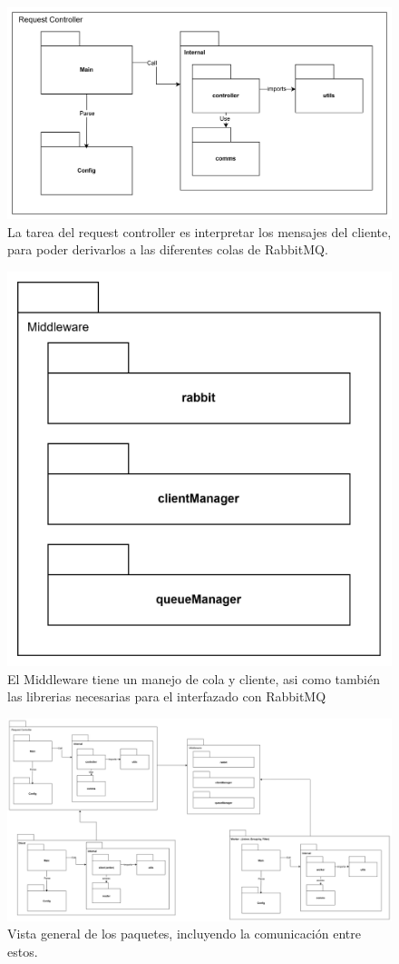 \documentclass[titlepage,a4paper]{article}
\begin{document}
\begin{figure}[H]
    \centering
    \includegraphics[width=1\linewidth]{request_controller.png}
    \caption{La tarea del request controller es interpretar los mensajes del cliente, para poder derivarlos a las diferentes colas de RabbitMQ.}
\end{figure}

\begin{figure}[H]
    \centering
    \includegraphics[width=0.45\linewidth]{middleware.png}
    \caption{El Middleware tiene un manejo de cola y cliente, asi como también las librerias necesarias para el interfazado con RabbitMQ}
\end{figure}
\begin{figure}
    \centering
    \includegraphics[width=1\linewidth]{general.png}
    \caption{Vista general de los paquetes, incluyendo la comunicación entre estos.}
\end{figure}
\end{document}
